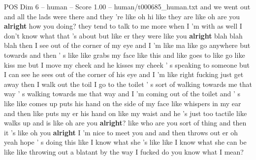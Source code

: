 \begin{textsample}{POS Dim 6 – human – Score 1.00 – human/t000685\_human.txt}  \label{ex:f6_pos_009}
and we went out and all the lads were there and they 're like oh hi like they are like oh are you \textbf{alright} how you doing? they tend to talk to me more when I 'm with as well I don't know what that 's about but like er they were like you \textbf{alright} blah blah blah then I see out of the corner of my eye and I 'm like ma like go anywhere but towards and then ' s like like grabs my face like this and like goes to like go like kiss me but I move my cheek and he kisses my cheek ' s speaking to someone but I can see he sees out of the corner of his eye and I 'm like right fucking just get away then I walk out the toil I go to the toilet ' s sort of walking towards me that way ' s walking towards me that way and I 'm coming out of the toilet and ' s like like comes up puts his hand on the side of my face like whispers in my ear and then like puts my er his hand on like my waist and he 's just too tactile like walks up and is like oh are you \textbf{alright}? like who are you sort of thing and then it 's like oh you \textbf{alright} I 'm nice to meet you and and then throws out er oh yeah hope ' s doing this like I know what she 's like like I know what she can be like like throwing out a blatant by the way I fucked do you know what I mean?

\end{textsample}
